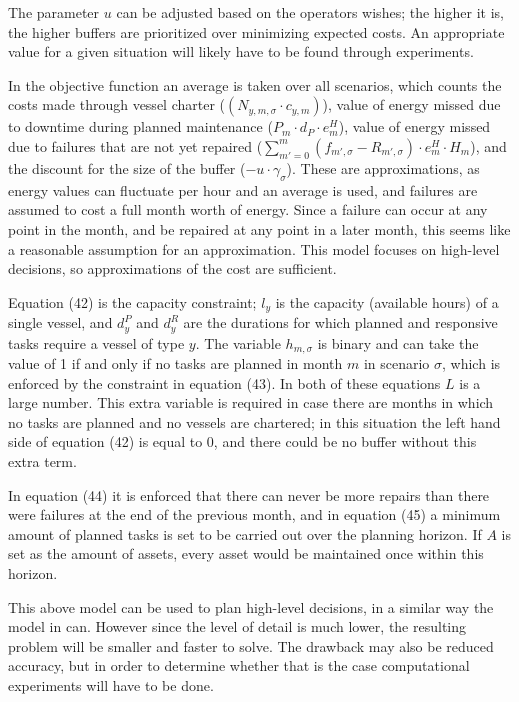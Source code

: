 \documentclass[a4paper,12pt]{article}
\begin{document}
The parameter $u$ can be adjusted based on the operators wishes; the higher it is, the higher buffers are prioritized over minimizing expected costs. An appropriate value for a given situation will likely have to be found through experiments. 

In the objective function an average is taken over all scenarios, which counts the costs made through vessel charter ($(N_{y,m,\sigma} \cdot c_{y,m})$), value of energy missed due to downtime during planned maintenance ($P_m \cdot d_P \cdot e^H_m$), value of energy missed due to failures that are not yet repaired ($\sum_{m' = 0}^{m} (f_{m',\sigma} - R_{m',\sigma}) \cdot e^H_m \cdot H_m$), and the discount for the size of the buffer ($- u \cdot \gamma_\sigma$). These are approximations, as energy values can fluctuate per hour and an average is used, and failures are assumed to cost a full month worth of energy. Since a failure can occur at any point in the month, and be repaired at any point in a later month, this seems like a reasonable assumption for an approximation. This model focuses on high-level decisions, so approximations of the cost are sufficient. 

Equation (42) is the capacity constraint; $l_y$ is the capacity (available hours) of a single vessel, and $d^P_y$ and $d^R_y$ are the durations for which planned and responsive tasks require a vessel of type $y$. The variable $h_{m,\sigma}$ is binary and can take the value of 1 if and only if no tasks are planned in month $m$ in scenario $\sigma$, which is enforced by the constraint in equation (43). In both of these equations $L$ is a large number. This extra variable is required in case there are months in which no tasks are planned and no vessels are chartered; in this situation the left hand side of equation (42) is equal to 0, and there could be no buffer without this extra term.

In equation (44) it is enforced that there can never be more repairs than there were failures at the end of the previous month, and in equation (45) a minimum amount of planned tasks is set to be carried out over the planning horizon. If $A$ is set as the amount of assets, every asset would be maintained once within this horizon. 

\bigskip

This above model can be used to plan high-level decisions, in a similar way the model in  can. However since the level of detail is much lower, the resulting problem will be smaller and faster to solve. The drawback may also be reduced accuracy, but in order to determine whether that is the case computational experiments will have to be done. 
\end{document}
